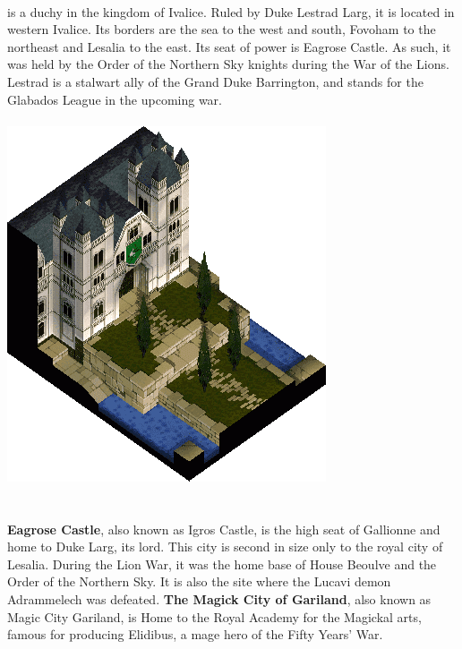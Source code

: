 \pagebreak\\
%
 is a duchy in the kingdom of Ivalice. 
Ruled by Duke Lestrad Larg, it is located in western Ivalice. 
Its borders are the sea to the west and south, Fovoham to the northeast and Lesalia to the east.
Its seat of power is Eagrose Castle. 
As such, it was held by the Order of the Northern Sky knights during the War of the Lions. 
Lestrad is a stalwart ally of the Grand Duke Barrington, and stands for the Glabados League in the upcoming war.
%
\\\\
\includegraphics[width=\columnwidth]{./art/images/belouveresidence.png}
\\\\\\
%
\textbf{Eagrose Castle}, also known as Igros Castle, is the high seat of Gallionne and home to Duke Larg, its lord. 
This city is second in size only to the royal city of Lesalia. 
During the Lion War, it was the home base of House Beoulve and the Order of the Northern Sky.
It is also the site where the Lucavi demon Adrammelech was defeated.
\textbf{The Magick City of Gariland}, also known as Magic City Gariland, is Home to the Royal Academy for the Magickal arts, famous for producing Elidibus, a mage hero of the Fifty Years' War. 
